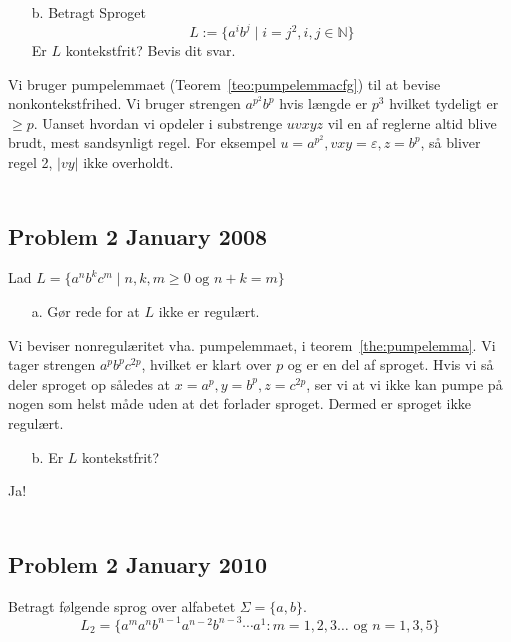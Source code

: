 \begin{enumerate}
  \item[b.] Betragt Sproget \[L := \{a^{i}b^{j} \mid i=j^{2}, i, j \in \mathbb{N}\}\] Er $L$ kontekstfrit? Bevis dit svar.
\end{enumerate}

Vi bruger pumpelemmaet (Teorem~\ref{teo:pumpelemmacfg}) til at bevise nonkontekstfrihed.
Vi bruger strengen $a^{p^{2}}b^{p}$ hvis længde er $p^{3}$ hvilket tydeligt er $\ge p$. Uanset hvordan vi opdeler i substrenge $uvxyz$ vil en af reglerne altid blive brudt, mest sandsynligt regel. For eksempel $u = a^{p^{2}}, vxy = \varepsilon, z = b^{p}$, så bliver regel 2, $|vy|$ ikke overholdt.
\\\\


\noindent
\subsection*{Problem 2 January 2008}
\noindent
Lad $L = \{a^{n}b^{k}c^{m} \mid n,k,m \ge 0 \text{ og } n+k = m\}$

\begin{enumerate}
  \item[a.] Gør rede for at $L$ ikke er regulært.
\end{enumerate}

Vi beviser nonregulæritet vha. pumpelemmaet, i teorem~\ref{the:pumpelemma}. Vi tager strengen $a^{p}b^{p}c^{2p}$, hvilket er klart over $p$ og er en del af sproget. Hvis vi så deler sproget op således at $x = a^{p}, y = b^{p}, z = c^{2p}$, ser vi at vi ikke kan pumpe på nogen som helst måde uden at det forlader sproget. Dermed er sproget ikke regulært.

\begin{enumerate}
  \item[b.] Er $L$ kontekstfrit?
\end{enumerate}



Ja!\\\\

\noindent
\subsection*{Problem 2 January 2010}
\noindent

Betragt følgende sprog over alfabetet $\Sigma = \{a,b\}$.
\[L_{2}= \{a^{m}a^{n}b^{n-1}a^{n-2}b^{n-3} \cdots a^{1} : m = 1,2,3 \ldots \text{ og } n = 1,3,5 \}\]
